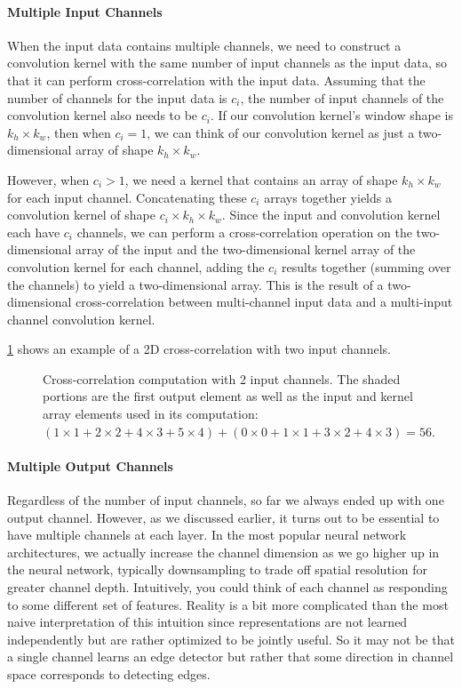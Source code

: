 \paragraph{Multiple Input Channels}

When the input data contains multiple channels, we need to construct a convolution kernel with the same number of input channels as the input data, so that it can perform cross-correlation with the input data. Assuming that the number of channels for the input data is $c_i$, the number of input channels of the convolution kernel also needs to be $c_i$. If our convolution kernel’s window shape is $k_h\times k_w$, then when $c_i=1$, we can think of our convolution kernel as just a two-dimensional array of shape $k_h\times k_w$.

However, when $c_i>1$, we need a kernel that contains an array of shape $k_h\times k_w$ for each input channel. Concatenating these $c_i$ arrays together yields a convolution kernel of shape $c_i\times k_h\times k_w$. Since the input and convolution kernel each have $c_i$ channels, we can perform a cross-correlation operation on the two-dimensional array of the input and the two-dimensional kernel array of the convolution kernel for each channel, adding the $c_i$ results together (summing over the channels) to yield a two-dimensional array. This is the result of a two-dimensional cross-correlation between multi-channel input data and a multi-input channel convolution kernel.

\cref{fig:conv_multi_in} shows an example of a 2D cross-correlation with two input channels. 

\begin{figure}[hpt]
    \centering
    
    \caption{Cross-correlation computation with 2 input channels. The shaded portions are the first output element as well as the input and kernel array elements used in its computation:  $(1 \times 1+2 \times 2+4\times3+5\times4)+(0\times0+1 \times 1+3\times2+4\times3)=56.$}
    \label{fig:conv_multi_in}
\end{figure}

\paragraph{Multiple Output Channels}

Regardless of the number of input channels, so far we always ended up with one output channel. However, as we discussed earlier, it turns out to be essential to have multiple channels at each layer. In the most popular neural network architectures, we actually increase the channel dimension as we go higher up in the neural network, typically downsampling to trade off spatial resolution for greater channel depth. Intuitively, you could think of each channel as responding to some different set of features. Reality is a bit more complicated than the most naive interpretation of this intuition since representations are not learned independently but are rather optimized to be jointly useful. So it may not be that a single channel learns an edge detector but rather that some direction in channel space corresponds to detecting edges.

